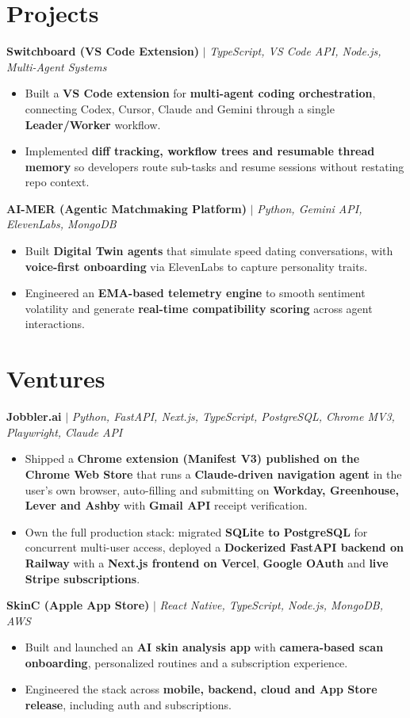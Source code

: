 \documentclass[10pt]{article}
\newcommand{\project}[2]{%
  \vspace{2pt}%
  \textbf{#1} $|$ \textit{#2}\vspace{1pt}%
}
\begin{document}
\section{Projects}

\project{Switchboard (VS Code Extension)}{TypeScript, VS Code API, Node.js, Multi-Agent Systems}
\begin{itemize}
  \item Built a \textbf{VS Code extension} for \textbf{multi-agent coding orchestration}, connecting Codex, Cursor, Claude and Gemini through a single \textbf{Leader/Worker} workflow.
  \item Implemented \textbf{diff tracking, workflow trees and resumable thread memory} so developers route sub-tasks and resume sessions without restating repo context.
\end{itemize}

\project{AI-MER (Agentic Matchmaking Platform)}{Python, Gemini API, ElevenLabs, MongoDB}
\begin{itemize}
  \item Built \textbf{Digital Twin agents} that simulate speed dating conversations, with \textbf{voice-first onboarding} via ElevenLabs to capture personality traits.
  \item Engineered an \textbf{EMA-based telemetry engine} to smooth sentiment volatility and generate \textbf{real-time compatibility scoring} across agent interactions.
\end{itemize}

\section{Ventures}

\project{Jobbler.ai}{Python, FastAPI, Next.js, TypeScript, PostgreSQL, Chrome MV3, Playwright, Claude API}
\begin{itemize}
  \item Shipped a \textbf{Chrome extension (Manifest V3) published on the Chrome Web Store} that runs a \textbf{Claude-driven navigation agent} in the user's own browser, auto-filling and submitting on \textbf{Workday, Greenhouse, Lever and Ashby} with \textbf{Gmail API} receipt verification.
  \item Own the full production stack: migrated \textbf{SQLite to PostgreSQL} for concurrent multi-user access, deployed a \textbf{Dockerized FastAPI backend on Railway} with a \textbf{Next.js frontend on Vercel}, \textbf{Google OAuth} and \textbf{live Stripe subscriptions}.
\end{itemize}

\project{SkinC (Apple App Store)}{React Native, TypeScript, Node.js, MongoDB, AWS}
\begin{itemize}
  \item Built and launched an \textbf{AI skin analysis app} with \textbf{camera-based scan onboarding}, personalized routines and a subscription experience.
  \item Engineered the stack across \textbf{mobile, backend, cloud and App Store release}, including auth and subscriptions.
\end{itemize}
\end{document}
